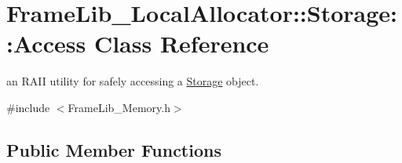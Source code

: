 \hypertarget{class_frame_lib___local_allocator_1_1_storage_1_1_access}{}\section{Frame\+Lib\+\_\+\+Local\+Allocator\+:\+:Storage\+:\+:Access Class Reference}
\label{class_frame_lib___local_allocator_1_1_storage_1_1_access}


an R\+A\+II utility for safely accessing a \hyperlink{class_frame_lib___local_allocator_1_1_storage}{Storage} object.  




{\ttfamily \#include $<$Frame\+Lib\+\_\+\+Memory.\+h$>$}

\subsection*{Public Member Functions}
